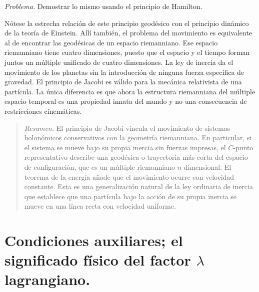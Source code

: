 \documentclass[12pt,a4paper]{book}
\begin{document}
\textit{Problema.} Demostrar lo mismo usando el principio de Hamilton.

Nótese la estrecha relación de este principio geodésico con el principio dinámico de la teoría de Einstein. Allí también, el problema del movimiento es equivalente al de encontrar las geodésicas de un espacio riemanniano. Ese espacio riemanniano tiene cuatro dimensiones, puesto que el espacio y el tiempo forman juntos un múltiple unificado de cuatro dimensiones. La ley de inercia da el movimiento de los planetas sin la introducción de ninguna fuerza específica de gravedad. El principio de Jacobi es válido para la mecánica relativista de una partícula. La única diferencia es que ahora la estructura riemanniana del múltiple espacio-temporal es una propiedad innata del mundo y no una consecuencia de restricciones cinemáticas.

\begin{quote}
\textit{Resumen.} El principio de Jacobi vincula el movimiento de sistemas holonómicos conservativos con la geometría riemanniana. En particular, si el sistema se mueve bajo su propia inercia sin fuerzas impresas, el $C$-punto representativo describe una geodésica o trayectoria más corta del espacio de configuración, que es un múltiple riemanniano $n$-dimensional. El teorema de la energía añade que el movimiento ocurre con velocidad constante. Esta es una generalización natural de la ley ordinaria de inercia que establece que una partícula bajo la acción de su propia inercia se mueve en una línea recta con velocidad uniforme.
\end{quote}


\section{Condiciones auxiliares; el significado físico del factor $\lambda$ lagrangiano.}
\end{document}
